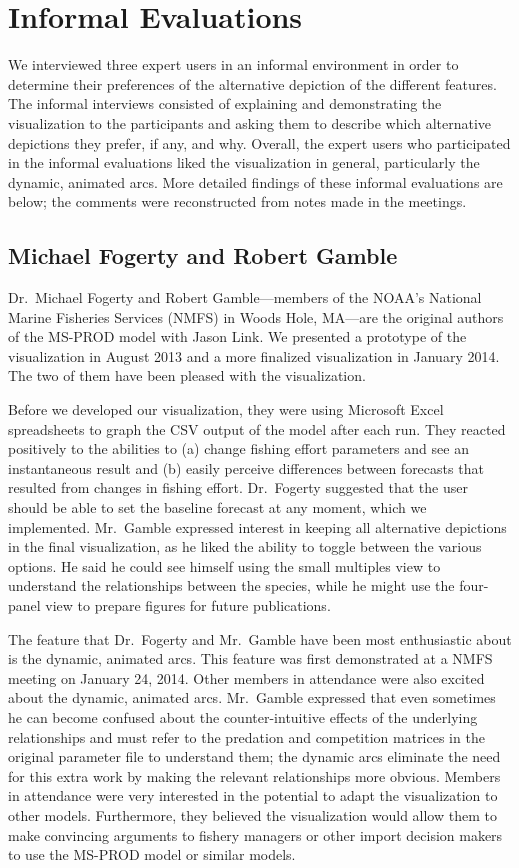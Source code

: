 \section{Informal Evaluations}

We interviewed three expert users in an informal environment in order to determine their preferences of the alternative depiction of the different features.  The informal interviews consisted of explaining and demonstrating the visualization to the participants and asking them to describe which alternative depictions they prefer, if any, and why.  Overall, the expert users who participated in the informal evaluations liked the visualization in general, particularly the dynamic, animated arcs.  More detailed findings of these informal evaluations are below; the comments were reconstructed from notes made in the meetings.

\subsection{Michael Fogerty and Robert Gamble} %

Dr.\ Michael Fogerty and Robert Gamble---members of the NOAA's National Marine Fisheries Services (NMFS) in Woods Hole, MA---are the original authors of the MS-PROD model with Jason Link.  We presented a prototype of the visualization in August 2013 and a more finalized visualization in January 2014.  The two of them have been pleased with the visualization.

Before we developed our visualization, they were using Microsoft Excel spreadsheets to graph the CSV output of the model after each run.  They reacted positively to the abilities to (a) change fishing effort parameters and see an instantaneous result and (b) easily perceive differences between forecasts that resulted from changes in fishing effort.  Dr.\ Fogerty suggested that the user should be able to set the baseline forecast at any moment, which we implemented.  Mr.\ Gamble expressed interest in keeping all alternative depictions in the final visualization, as he liked the ability to toggle between the various options.  He said he could see himself using the small multiples view to understand the relationships between the species, while he might use the four-panel view to prepare figures for future publications.

The feature that Dr.\ Fogerty and Mr.\ Gamble have been most enthusiastic about is the dynamic, animated arcs.  This feature was first demonstrated at a NMFS meeting on January 24, 2014.  Other members in attendance were also excited about the dynamic, animated arcs.  Mr.\ Gamble expressed that even sometimes he can become confused about the counter-intuitive effects of the underlying relationships and must refer to the predation and competition matrices in the original parameter file to understand them; the dynamic arcs eliminate the need for this extra work by making the relevant relationships more obvious.  Members in attendance were very interested in the potential to adapt the visualization to other models.  Furthermore, they believed the visualization would allow them to make convincing arguments to fishery managers or other import decision makers to use the MS-PROD model or similar models.

